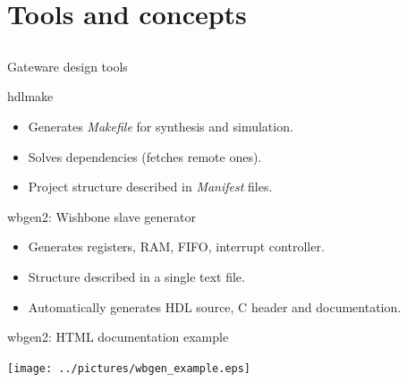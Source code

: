\documentclass[compress,red]{beamer}
\begin{document}
\section{Tools and concepts}

\subsection*{} %

\begin{frame}{Gateware design tools}

  \begin{block}{hdlmake}
    \begin{itemize}
    \item Generates \textit{Makefile} for synthesis and simulation.
    \item Solves dependencies (fetches remote ones).
    \item Project structure described in \textit{Manifest} files.
    \end{itemize}
  \end{block}

  \begin{block}{wbgen2: Wishbone slave generator}
    \begin{itemize}
    \item Generates registers, RAM, FIFO, interrupt controller.
    \item Structure described in a single text file.
    \item Automatically generates HDL source, C header and documentation.
    \end{itemize}
  \end{block}


\end{frame}

\begin{frame}{wbgen2: HTML documentation example}

  \begin{center}
    \texttt{[image: ../pictures/wbgen\_example.eps]}
  \end{center}


\end{frame}
\end{document}
